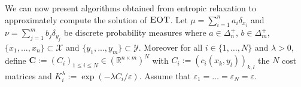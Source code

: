 We can now present algorithms obtained from entropic relaxation to approximately compute the solution of $\textsc{EOT}$. Let $\mu=\sum_{i=1}^n a_i\delta_{x_i}$ and $\nu=\sum_{j=1}^m b_j\delta_{y_j}$ be discrete probability measures where $a\in\Delta_n^{+}$, $b\in\Delta^+_m$, $\{x_1,...,x_n\}\subset \mathcal{X}$ and $\{y_1,...,y_m\}\subset \mathcal{Y}$. Moreover for all $i\in\{1,\dots,N\}$ and $\lambda>0$, define $\mathbf{C}:=(C_i)_{1\leq i\leq N}\in\left(\mathbb{R}^{n\times m}\right)^N$ with $C_i:=(c_i(x_k,y_l))_{k,l}$ the $N$ cost matrices and $K_i^{\lambda}:=\exp\left(-\lambda C_{i}/\varepsilon\right)$. Assume that  $\varepsilon_1=\dots=\varepsilon_N=\varepsilon$.
